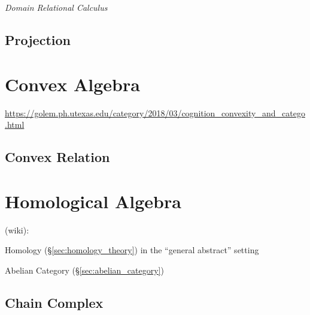 \emph{Domain Relational Calculus}

\subsection{Projection}\label{sec:relational_projection}



\section{Convex Algebra}\label{sec:convex_algebra}


\url{https://golem.ph.utexas.edu/category/2018/03/cognition_convexity_and_catego.html}



\subsection{Convex Relation}\label{sec:convex_relation}



\section{Homological Algebra}\label{sec:homological_algebra}

(wiki):

Homology (\S\ref{sec:homology_theory}) in the ``general abstract'' setting

Abelian Category (\S\ref{sec:abelian_category})



\subsection{Chain Complex}\label{sec:chain_complex}

